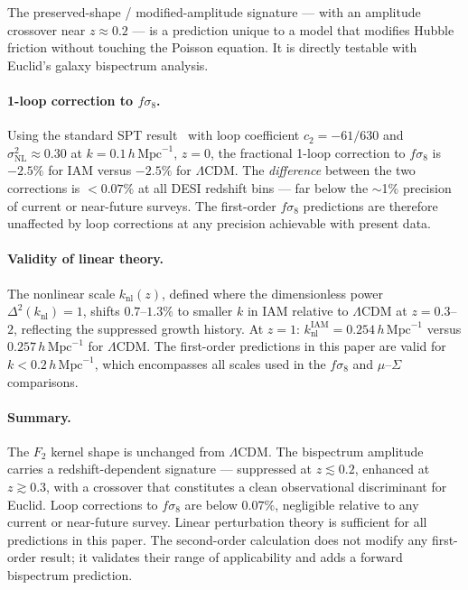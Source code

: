 \documentclass[11pt]{article}
\begin{document}
The preserved-shape / modified-amplitude signature --- with an amplitude
crossover near $z \approx 0.2$ --- is a prediction unique to a model
that modifies Hubble friction without touching the Poisson equation.
It is directly testable with Euclid's galaxy bispectrum analysis.

\paragraph{1-loop correction to $f\sigma_8$.}
Using the standard SPT result~\citep{Bernardeau2002} with
loop coefficient $c_2 = -61/630$ and
$\sigma_\mathrm{NL}^2 \approx 0.30$ at $k = 0.1\,h\,\mathrm{Mpc}^{-1}$,
$z=0$, the fractional 1-loop correction to $f\sigma_8$ is $-2.5\%$ for IAM
versus $-2.5\%$ for $\Lambda$CDM.  The \textit{difference} between the
two corrections is $< 0.07\%$ at all DESI redshift bins --- far below
the $\sim$1\% precision of current or near-future surveys.  The
first-order $f\sigma_8$ predictions are therefore unaffected by loop
corrections at any precision achievable with present data.

\paragraph{Validity of linear theory.}
The nonlinear scale $k_\mathrm{nl}(z)$, defined where the dimensionless
power $\Delta^2(k_\mathrm{nl}) = 1$, shifts $0.7$--$1.3\%$ to smaller
$k$ in IAM relative to $\Lambda$CDM at $z = 0.3$--$2$, reflecting the
suppressed growth history.  At $z = 1$:
$k_\mathrm{nl}^\mathrm{IAM} = 0.254\,h\,\mathrm{Mpc}^{-1}$ versus
$0.257\,h\,\mathrm{Mpc}^{-1}$ for $\Lambda$CDM.  The first-order
predictions in this paper are valid for
$k < 0.2\,h\,\mathrm{Mpc}^{-1}$, which encompasses all scales used in
the $f\sigma_8$ and $\mu$--$\Sigma$ comparisons.

\paragraph{Summary.}
The $F_2$ kernel shape is unchanged from $\Lambda$CDM.  The bispectrum
amplitude carries a redshift-dependent signature --- suppressed at
$z \lesssim 0.2$, enhanced at $z \gtrsim 0.3$, with a crossover that
constitutes a clean observational discriminant for Euclid.  Loop
corrections to $f\sigma_8$ are below $0.07\%$, negligible relative to
any current or near-future survey.  Linear perturbation theory is
sufficient for all predictions in this paper.  The second-order
calculation does not modify any first-order result; it validates their
range of applicability and adds a forward bispectrum prediction.
\end{document}

